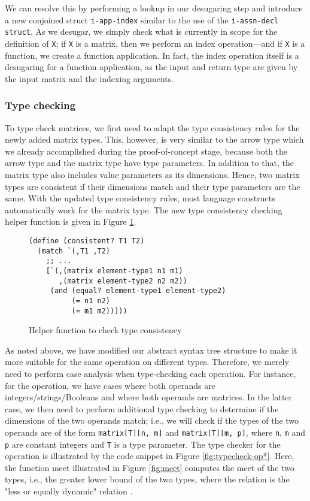 We can resolve this by performing a lookup in our desugaring step and introduce a new conjoined struct {\tt i-app-index} similar to the use of the {\tt i-assn-decl struct}. As we desugar, we simply check what is currently in scope for the definition of {\tt X}; if {\tt X} is a matrix, then we perform an index operation---and if {\tt X} is a function, we create a function application. In fact, the index operation itself is a desugaring for a function application, as the input and return type are given by the input matrix and the indexing arguments.

\subsubsection{Type checking}

To type check matrices, we first need to adapt the type consistency rules for the newly added matrix types. This, however, is very similar to the arrow type which we already accomplished during the proof-of-concept stage, because both the arrow type and the matrix type have type parameters. In addition to that, the matrix type also includes value parameters as its dimensions. Hence, two matrix types are consistent if their dimensions match and their type parameters are the same. With the updated type consistency rules, most language constructs automatically work for the matrix type. The new type consistency checking helper function is given in Figure \ref{fig:typeconsistency}.

\begin{figure}[h]
    \begin{lstlisting}[language=racket]
(define (consistent? T1 T2)
  (match `(,T1 ,T2)
    ;; ...
    [`(,(matrix element-type1 n1 m1)
       ,(matrix element-type2 n2 m2))
     (and (equal? element-type1 element-type2)
          (= n1 n2)
          (= m1 m2))]))
    \end{lstlisting}
    \caption[]{Helper function to check type consistency}
    \label{fig:typeconsistency}
\end{figure}

As noted above, we have modified our abstract syntax tree structure to make it more suitable for the same operation on different types. Therefore, we merely need to perform case analysis when type-checking each operation. For instance, for the {\tt *} operation, we have cases where both operands are integers/strings/Booleans and where both operands are matrices. In the latter case, we then need to perform additional type checking to determine if the dimensions of the two operands match; i.e., we will check if the types of the two operands are of the form {\tt matrix[T][n, m]} and {\tt matrix[T][m, p]}, where {\tt n}, {\tt m} and {\tt p} are constant integers and {\tt T} is a type parameter. The type checker for the {\tt *} operation is illustrated by the code snippet in Figure \ref{fig:typecheck-op*}. Here, the function meet illustrated in Figure \ref{fig:meet} computes the meet of the two types, i.e., the greater lower bound of the two types, where the relation is the "less or equally dynamic" relation \cite{siek2012interpretations}.

